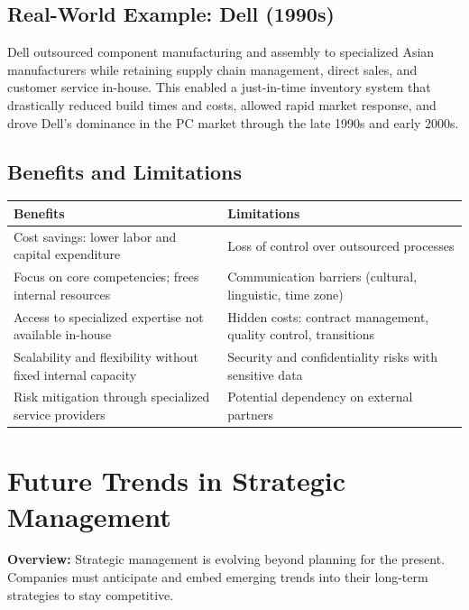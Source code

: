 \documentclass[11pt, letterpaper]{article}
\begin{document}
\subsection{Real-World Example: Dell (1990s)}

Dell outsourced component manufacturing and assembly to specialized Asian manufacturers while retaining supply chain management, direct sales, and customer service in-house. This enabled a just-in-time inventory system that drastically reduced build times and costs, allowed rapid market response, and drove Dell's dominance in the PC market through the late 1990s and early 2000s.

\subsection{Benefits and Limitations}

\begin{center}
\begin{tabular}{p{6.5cm} p{6.5cm}}
\toprule
\textbf{Benefits} & \textbf{Limitations} \\
\midrule
Cost savings: lower labor and capital expenditure & Loss of control over outsourced processes \\
Focus on core competencies; frees internal resources & Communication barriers (cultural, linguistic, time zone) \\
Access to specialized expertise not available in-house & Hidden costs: contract management, quality control, transitions \\
Scalability and flexibility without fixed internal capacity & Security and confidentiality risks with sensitive data \\
Risk mitigation through specialized service providers & Potential dependency on external partners \\
\bottomrule
\end{tabular}
\end{center}

\newpage

\section{Future Trends in Strategic Management}

\begin{defbox}
\textbf{Overview:} Strategic management is evolving beyond planning for the present. Companies must anticipate and embed emerging trends into their long-term strategies to stay competitive.
\end{defbox}
\end{document}
